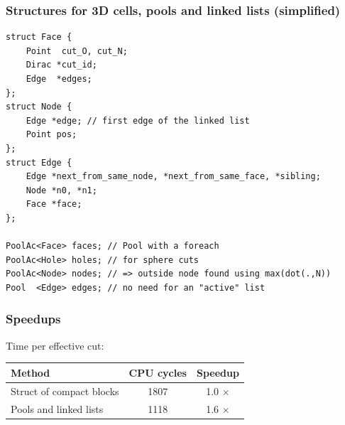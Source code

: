 \documentclass[aspectratio=169]{beamer}
\begin{document}

\begin{frame}[fragile]
    \frametitle{Structures for 3D cells, pools and linked lists (simplified)}

\begin{footnotesize}
\begin{lstlisting} 
struct Face {
    Point  cut_O, cut_N;
    Dirac *cut_id;
    Edge  *edges;    
};
struct Node {
    Edge *edge; // first edge of the linked list
    Point pos;
};
struct Edge {
    Edge *next_from_same_node, *next_from_same_face, *sibling;
    Node *n0, *n1;  
    Face *face;
};

PoolAc<Face> faces; // Pool with a foreach
PoolAc<Hole> holes; // for sphere cuts
PoolAc<Node> nodes; // => outside node found using max(dot(.,N))
Pool  <Edge> edges; // no need for an "active" list 
\end{lstlisting}
\end{footnotesize}
\end{frame}

\begin{frame}
    \frametitle{Speedups}

    Time per effective cut:

    \medskip
    \begin{center}    
    \begin{tabular}{|l|c|c|}
        \hline
        Method                   & CPU cycles & Speedup    \\
        \hline
        Struct of compact blocks & 1807        & 1.0 $\times$ \\
        Pools and linked lists   & 1118        & 1.6 $\times$ \\
        \hline
    \end{tabular}
    \end{center}
\end{frame}
\end{document}
